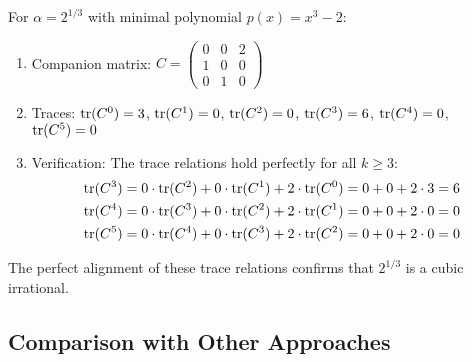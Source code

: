 \begin{example}
For $\alpha = 2^{1/3}$ with minimal polynomial $p(x) = x^3 - 2$:
\begin{enumerate}
    \item Companion matrix: $C = \begin{pmatrix} 0 & 0 & 2 \\ 1 & 0 & 0 \\ 0 & 1 & 0 \end{pmatrix}$
    \item Traces: $\operatorname{tr}(C^0) = 3$, $\operatorname{tr}(C^1) = 0$, $\operatorname{tr}(C^2) = 0$, $\operatorname{tr}(C^3) = 6$, $\operatorname{tr}(C^4) = 0$, $\operatorname{tr}(C^5) = 0$
    \item Verification: The trace relations hold perfectly for all $k \geq 3$:
    \begin{align*}
        \operatorname{tr}(C^3) &= 0 \cdot \operatorname{tr}(C^2) + 0 \cdot \operatorname{tr}(C^1) + 2 \cdot \operatorname{tr}(C^0) = 0 + 0 + 2 \cdot 3 = 6 \\
        \operatorname{tr}(C^4) &= 0 \cdot \operatorname{tr}(C^3) + 0 \cdot \operatorname{tr}(C^2) + 2 \cdot \operatorname{tr}(C^1) = 0 + 0 + 2 \cdot 0 = 0 \\
        \operatorname{tr}(C^5) &= 0 \cdot \operatorname{tr}(C^4) + 0 \cdot \operatorname{tr}(C^3) + 2 \cdot \operatorname{tr}(C^2) = 0 + 0 + 2 \cdot 0 = 0
    \end{align*}
\end{enumerate}
The perfect alignment of these trace relations confirms that $2^{1/3}$ is a cubic irrational.
\end{example}

\subsection{Comparison with Other Approaches}


